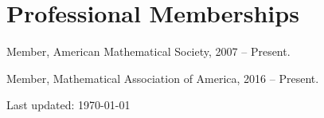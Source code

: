 \documentclass[10pt,letterpaper]{article}
\renewenvironment{itemize}{
  \begin{list}{}{
    \setlength{\leftmargin}{1.5em}
    \setlength{\itemsep}{0.25em}
    \setlength{\parskip}{0pt}
    \setlength{\parsep}{0.25em}
  }
}{
  \end{list}
}
\providecommand{\tightlist}{%
  \setlength{\itemsep}{0pt}\setlength{\parskip}{0pt}}
\let\tightlist\relax
\begin{document}
\hypertarget{professional-memberships}{%
\section*{Professional Memberships}\label{professional-memberships}}

\begin{itemize}
\tightlist
\item
  Member, American Mathematical Society, 2007 -- Present.
\item
  Member, Mathematical Association of America, 2016 -- Present.
\end{itemize}
\bigskip
{\small Last updated: \today}
\end{document}
